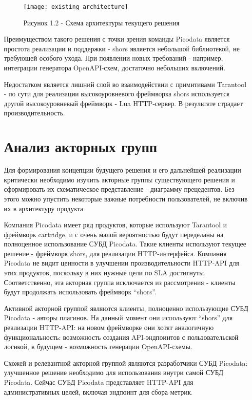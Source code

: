 \documentclass[times,numbers=noenddot]{itmo-student-thesis}
\begin{document}
\begin{figure}[!h]
	\caption*{Рисунок 1.2 - Схема архитектуры текущего решения}\label{fig2}
	\centering
	\texttt{[image: existing\_architecture]}
\end{figure}


Преимуществом такого решения с точки зрения команды Picodata является простота реализации и поддержки - shors является небольшой библиотекой, не требующей особого ухода.
При появлении новых требований - например, интеграции генератора OpenAPI-схем, достаточно небольших включений.

Недостатком является лишний слой во взаимодействии с примитивами Tarantool - по сути для реализации высокоуровневого фреймворка shors используется другой высокоуровневый фреймворк - Lua HTTP-сервер.
В результате страдает производительность.

\section{Анализ акторных групп}\label{sec:analyze_actors}

Для формирования концепции будущего решения и его дальнейшей реализации критически необходимо изучить акторные группы существующего решения и сформировать их схематическое представление - диаграмму прецедентов.
Без этого можно упустить некоторые важные потребности пользователей, не включив их в архитектуру продукта.

Компания Picodata имеет ряд продуктов, которые используют Tarantool и фреймворк cartridge, и с очень малой вероятностью будут переделаны на полноценное использование СУБД Picodata.
Такие клиенты используют текущее решение - фреймворк shors, для реализации HTTP-интерфейса.
Компания Picodata не видит ценности в улучшении производительности HTTP-API для этих продуктов, поскольку в них нужные цели по SLA достигнуты.
Соответственно, эта акторная группа исключается из рассмотрения - клиенты будут продолжать использовать фреймворк “shors”.

Активной акторной группой являются клиенты, полноценно использующие СУБД Picodata - авторы плагинов.
На данный момент они используют “shors” для реализации HTTP-API: на новом фреймворке они хотят  аналогичную функциональность: возможность создания API-эндпоинтов с пользовательской логикой, в будущем - возможность генерации OpenAPI-схемы.

Схожей и релевантной акторной группой являются разработчики СУБД Picodata: улучшенное решение необходимо для использования внутри самой СУБД Picodata.
Сейчас СУБД Picodata представляет HTTP-API для административных целей, включая эндпоинт для сбора метрик.
\end{document}
